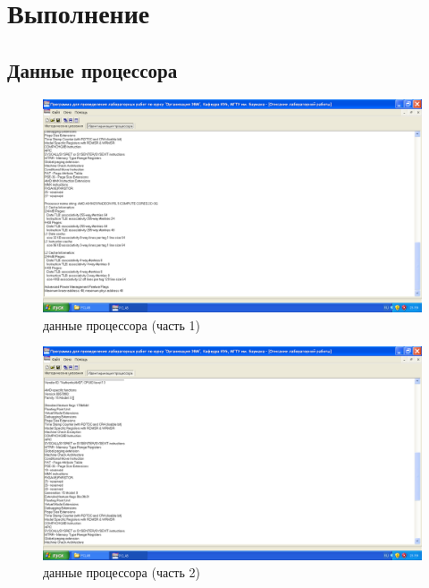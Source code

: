 \section{Выполнение}
\subsection{Данные процессора}
\begin{figure}
	\centering
	\includegraphics[width=1\linewidth]{../images/screenshot001}
	\caption{данные процессора (часть 1)}
	\label{fig:screenshot001}
\end{figure}
\begin{figure}
	\centering
	\includegraphics[width=1\linewidth]{../images/screenshot002}
	\caption{данные процессора (часть 2)}
	\label{fig:screenshot002}
\end{figure}
